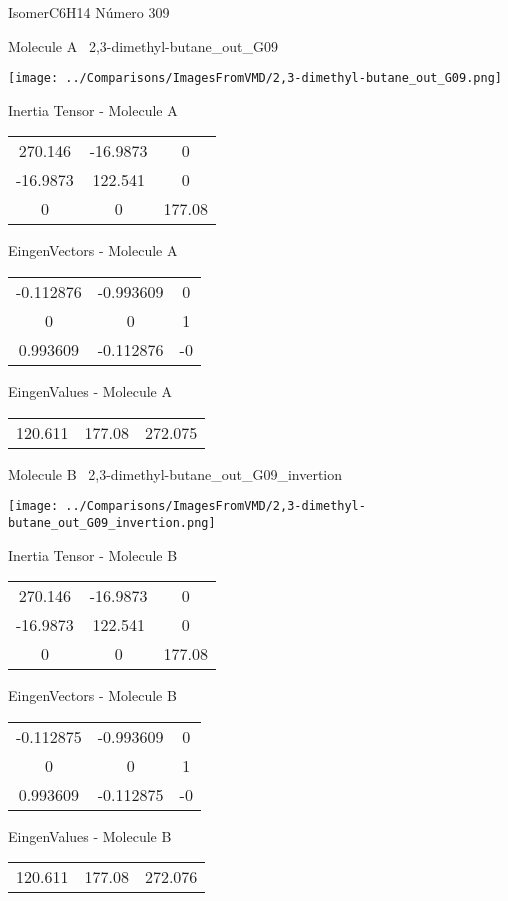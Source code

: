 \vtab[-3cm]
\begin{center}
{\large IsomerC6H14 \tab Número 309}
\end{center}
\begin{multicols}{2}
\begin{center}

Molecule A \
2,3-dimethyl-butane\_out\_G09

\texttt{[image: ../Comparisons/ImagesFromVMD/2,3-dimethyl-butane\_out\_G09.png]}

Inertia Tensor - Molecule A \\
\begin{tabular}{|c c c|}
270.146	 & 	-16.9873	 & 	0	 \\
-16.9873	 & 	122.541	 & 	0	 \\
0	 & 	0	 & 	177.08
\end{tabular}

\vtab
 EingenVectors - Molecule A     \\
\begin{tabular}{|c c c|}
-0.112876	 & 	-0.993609	 & 	0	 \\
0	 & 	0	 & 	1	 \\
0.993609	 & 	-0.112876	 & 	-0
\end{tabular}

\vtab
 EingenValues - Molecule A     \\
\begin{tabular}{|c c c|}
120.611	 & 	177.08	 & 	272.075	 \\
\end{tabular}
\columnbreak

Molecule B \
2,3-dimethyl-butane\_out\_G09\_invertion

\texttt{[image: ../Comparisons/ImagesFromVMD/2,3-dimethyl-butane\_out\_G09\_invertion.png]}

Inertia Tensor - Molecule B \\
\begin{tabular}{|c c c|}
270.146	 & 	-16.9873	 & 	0	 \\
-16.9873	 & 	122.541	 & 	0	 \\
0	 & 	0	 & 	177.08
\end{tabular}

\vtab
 EingenVectors - Molecule B     \\
\begin{tabular}{|c c c|}
-0.112875	 & 	-0.993609	 & 	0	 \\
0	 & 	0	 & 	1	 \\
0.993609	 & 	-0.112875	 & 	-0
\end{tabular}

\vtab
 EingenValues - Molecule B     \\
\begin{tabular}{|c c c|}
120.611	 & 	177.08	 & 	272.076	 \\
\end{tabular}

\end{center}
\end{multicols}

